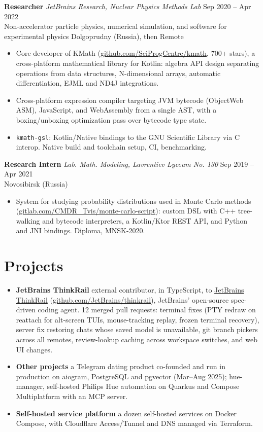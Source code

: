 \documentclass[10pt,a4paper]{article}
\newcommand{\role}[4]{%
  \needspace{4\baselineskip}%
  \noindent\textbf{#1} \textemdash{} \textit{#2} \hfill {\small\color{subtle}#3}\\[-0.25em]
  {\small\color{subtle}#4}\par\vspace{0.1em}
}
\begin{document}
\role{Researcher}{JetBrains Research, Nuclear Physics Methods Lab}{Sep 2020 -- Apr 2022}{Non-accelerator particle physics, numerical simulation, and software for experimental physics \textbullet{} Dolgoprudny (Russia), then Remote}
\begin{itemize}
  \item Core developer of KMath (\href{https://github.com/SciProgCentre/kmath}{github.com/SciProgCentre/kmath}, 700+ stars), a cross-platform mathematical library for Kotlin: algebra API design separating operations from data structures, N-dimensional arrays, automatic differentiation, EJML and ND4J integrations.
  \item Cross-platform expression compiler targeting JVM bytecode (ObjectWeb ASM), JavaScript, and WebAssembly from a single AST, with a boxing/unboxing optimization pass over bytecode type state.
  \item \texttt{kmath-gsl}: Kotlin/Native bindings to the GNU Scientific Library via C interop. Native build and toolchain setup, CI, benchmarking.
\end{itemize}

\role{Research Intern}{Lab. Math. Modeling, Lavrentiev Lyceum No. 130}{Sep 2019 -- Apr 2021}{Novosibirsk (Russia)}
\begin{itemize}
  \item System for studying probability distributions used in Monte Carlo methods (\href{https://gitlab.com/CMDR_Tvis/monte-carlo-script}{gitlab.com/CMDR\_Tvis/monte-carlo-script}): custom DSL with C++ tree-walking and bytecode interpreters, a Kotlin/Ktor REST API, and Python and JNI bindings. Diploma, MNSK-2020.
\end{itemize}

\section*{Projects}

\begin{itemize}
  \item \textbf{JetBrains ThinkRail} \textemdash{} external contributor, in TypeScript, to \href{https://github.com/JetBrains/thinkrail}{JetBrains ThinkRail} (\url{github.com/JetBrains/thinkrail}), JetBrains' open-source spec-driven coding agent. 12 merged pull requests: terminal fixes (PTY redraw on reattach for alt-screen TUIs, mouse-tracking replay, frozen terminal recovery), server fix restoring chats whose saved model is unavailable, git branch pickers across all remotes, review-lookup caching across workspace switches, and web UI changes.
  \item \textbf{Other projects} \textemdash{} a Telegram dating product co-founded and run in production on aiogram, PostgreSQL and pgvector (Mar--Aug 2025); hue-manager, self-hosted Philips Hue automation on Quarkus and Compose Multiplatform with an MCP server.
  \item \textbf{Self-hosted service platform} \textemdash{} a dozen self-hosted services on Docker Compose, with Cloudflare Access/Tunnel and DNS managed via Terraform.
\end{itemize}
\end{document}
